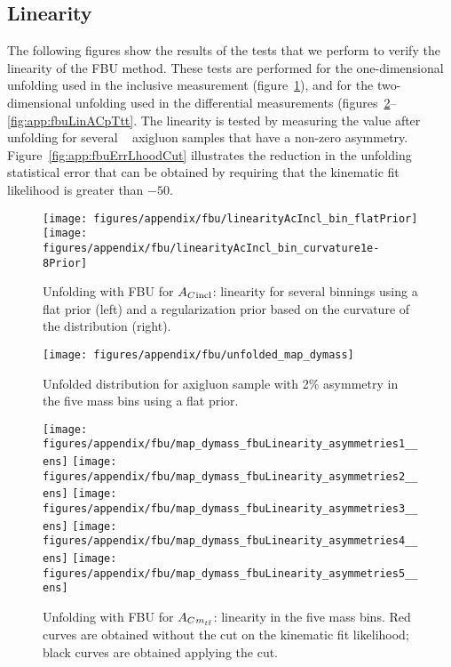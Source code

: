 \subsection{Linearity}
\label{sec:app:unfolding:linearity}
The following figures show the results of the tests that we perform to
verify the linearity of the FBU method.  These tests are performed for
the one-dimensional unfolding used in the inclusive measurement
(figure~\ref{fig:app:fbuLin}), and for the two-dimensional unfolding
used in the differential measurements
(figures~\ref{fig:app:fbuUnfACmtt}--\ref{fig:app:fbuLinACpTtt}.  The
linearity is tested by measuring the \ac{} value after unfolding for
several \protos{}~\cite{bib:protos} axigluon samples that have a
non-zero asymmetry. Figure~\ref{fig:app:fbuErrLhoodCut} illustrates
the reduction in the unfolding statistical error that can be obtained
by requiring that the kinematic fit likelihood is greater than $-50$.
\begin{figure}\centering
  \texttt{[image: figures/appendix/fbu/linearityAcIncl\_bin\_flatPrior]}
  \texttt{[image: figures/appendix/fbu/linearityAcIncl\_bin\_curvature1e-8Prior]}
  \caption{
    \label{fig:app:fbuLin}
    Unfolding with FBU for $A_C{}_{\text{incl}}$: linearity for
    several \dy{} binnings using a flat prior (left) and a regularization prior 
    based on the curvature of the \dy{} distribution (right).
    }
\end{figure}
%
\begin{figure}
  \begin{center}
  \texttt{[image: figures/appendix/fbu/unfolded\_map\_dymass]}
  \caption{
    \label{fig:app:fbuUnfACmtt}
    Unfolded \dy{} distribution for axigluon sample with 2\% asymmetry
    in the five \ttbar{} mass bins using a flat prior.
    }
  \end{center}
\end{figure}
%
\begin{figure}
  \begin{center}
  \texttt{[image: figures/appendix/fbu/map\_dymass\_fbuLinearity\_asymmetries1\_\_ens]}
  \texttt{[image: figures/appendix/fbu/map\_dymass\_fbuLinearity\_asymmetries2\_\_ens]}
  \texttt{[image: figures/appendix/fbu/map\_dymass\_fbuLinearity\_asymmetries3\_\_ens]}
  \texttt{[image: figures/appendix/fbu/map\_dymass\_fbuLinearity\_asymmetries4\_\_ens]}
  \texttt{[image: figures/appendix/fbu/map\_dymass\_fbuLinearity\_asymmetries5\_\_ens]}
  \caption{
    \label{fig:app:fbuLinACmtt}
    Unfolding with FBU for $A_C{}_{m_{t\bar{t}}{}}$: linearity in the five
    \ttbar{} mass bins. Red curves are obtained
    without the cut on the kinematic fit likelihood; black curves are
    obtained applying the cut.
  }
  \end{center}
\end{figure}
